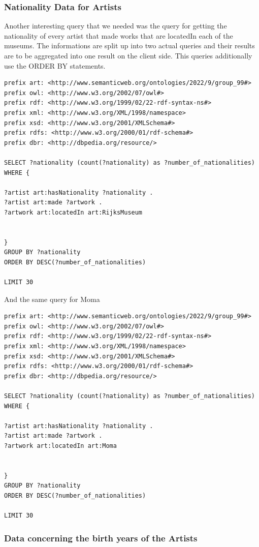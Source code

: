\documentclass{article}
\begin{document}
\subsubsection{Nationality Data for Artists}

Another interesting query that we needed was the query for getting the nationality of every artist that made works that are locatedIn each of the museums. The informations are split up into two actual queries and their results are to be aggregated into one result on the client side. This queries additionally use the ORDER BY statements. 

\begin{verbatim}
prefix art: <http://www.semanticweb.org/ontologies/2022/9/group_99#>
prefix owl: <http://www.w3.org/2002/07/owl#> 
prefix rdf: <http://www.w3.org/1999/02/22-rdf-syntax-ns#> 
prefix xml: <http://www.w3.org/XML/1998/namespace> 
prefix xsd: <http://www.w3.org/2001/XMLSchema#> 
prefix rdfs: <http://www.w3.org/2000/01/rdf-schema#> 
prefix dbr: <http://dbpedia.org/resource/>

SELECT ?nationality (count(?nationality) as ?number_of_nationalities) WHERE { 

?artist art:hasNationality ?nationality .
?artist art:made ?artwork .
?artwork art:locatedIn art:RijksMuseum


}
GROUP BY ?nationality 
ORDER BY DESC(?number_of_nationalities)

LIMIT 30
\end{verbatim}
\newline
And the same query for Moma
\begin{verbatim}
prefix art: <http://www.semanticweb.org/ontologies/2022/9/group_99#>
prefix owl: <http://www.w3.org/2002/07/owl#> 
prefix rdf: <http://www.w3.org/1999/02/22-rdf-syntax-ns#> 
prefix xml: <http://www.w3.org/XML/1998/namespace> 
prefix xsd: <http://www.w3.org/2001/XMLSchema#> 
prefix rdfs: <http://www.w3.org/2000/01/rdf-schema#> 
prefix dbr: <http://dbpedia.org/resource/>

SELECT ?nationality (count(?nationality) as ?number_of_nationalities) WHERE { 

?artist art:hasNationality ?nationality .
?artist art:made ?artwork .
?artwork art:locatedIn art:Moma


}
GROUP BY ?nationality 
ORDER BY DESC(?number_of_nationalities)

LIMIT 30
\end{verbatim}
\subsubsection{Data concerning the birth years of the Artists}
\end{document}
